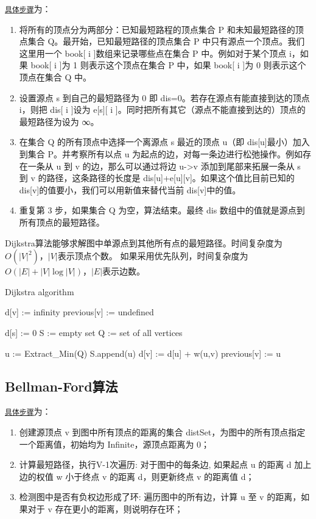 \href{http://wiki.jikexueyuan.com/project/easy-learn-algorithm/dijkstra.html}{\texttt{具体步骤}}为：
\begin{enumerate}
\item 将所有的顶点分为两部分：已知最短路程的顶点集合 P 和未知最短路径的顶点集合 Q。最开始，已知最短路径的顶点集合 P 中只有源点一个顶点。我们这里用一个 book[ i ]数组来记录哪些点在集合 P 中。例如对于某个顶点 i，如果 book[ i ]为 1 则表示这个顶点在集合 P 中，如果 book[ i ]为 0 则表示这个顶点在集合 Q 中。
\item 设置源点 s 到自己的最短路径为 0 即 dis=0。若存在源点有能直接到达的顶点 i，则把 dis[ i ]设为 e[s][ i ]。同时把所有其它（源点不能直接到达的）顶点的最短路径为设为 ∞。
\item 在集合 Q 的所有顶点中选择一个离源点 s 最近的顶点 u（即 dis[u]最小）加入到集合 P。并考察所有以点 u 为起点的边，对每一条边进行松弛操作。例如存在一条从 u 到 v 的边，那么可以通过将边 u->v 添加到尾部来拓展一条从 s 到 v 的路径，这条路径的长度是 dis[u]+e[u][v]。如果这个值比目前已知的 dis[v]的值要小，我们可以用新值来替代当前 dis[v]中的值。
\item 重复第 3 步，如果集合 Q 为空，算法结束。最终 dis 数组中的值就是源点到所有顶点的最短路径。
\end{enumerate}

Dijkstra算法能够求解图中单源点到其他所有点的最短路径。时间复杂度为$O(|V|^2)$，$|V|$表示顶点个数。
如果采用优先队列，时间复杂度为$O(|E|+|V|\log|V|)$，$|E|$表示边数。

\begin{algorithm}[h] \caption{Dijkstra algorithm} 
\begin{algorithmic}[1] 
\STATE d[v] := infinity
\STATE previous[v] := undefined
\ENDFOR

\STATE d[s] := 0      
\STATE S := empty set
\STATE Q := set of all vertices

\STATE u := Extract_Min(Q)
\STATE S.append(u)
\STATE d[v] := d[u] + w(u,v)
\STATE previous[v] := u
\ENDIF
\ENDFOR
\ENDWHILE

\end{algorithmic} \end{algorithm}


\subsection{Bellman-Ford算法}
\href{http://www.cnblogs.com/gaochundong/p/bellman_ford_algorithm.html}{\texttt{具体步骤}}为：
\begin{enumerate}
	\item 创建源顶点 v 到图中所有顶点的距离的集合 distSet，为图中的所有顶点指定一个距离值，初始均为 Infinite，源顶点距离为 0；
	\item 计算最短路径，执行V-1次遍历: 对于图中的每条边, 如果起点 u 的距离 d 加上边的权值 w 小于终点 v 的距离 d，则更新终点 v 的距离值 d；
	\item 检测图中是否有负权边形成了环: 遍历图中的所有边，计算 u 至 v 的距离，如果对于 v 存在更小的距离，则说明存在环；
\end{enumerate}

